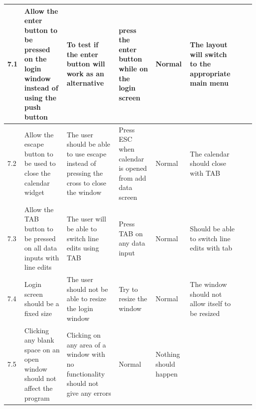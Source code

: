 \begin{landscape}
\begin{center}
\begin{longtable}{|p{1.5cm}|p{2.5cm}|p{2.5cm}|p{4cm}|p{2cm}|p{2cm}|p{1cm}|p{1cm}|}
7.1 & Allow the enter button to be pressed on the login window instead of using the push button & To test if the enter button will work as an alternative & press the enter button while on the login screen & Normal & The layout will switch to the appropriate main menu && \\ \hline
7.2 & Allow the escape button to be used to close the calendar widget & The user should be able to use escape instead of pressing the cross to close the window & Press ESC when calendar is opened from add data screen & Normal & The calendar should close with TAB && \\ \hline
7.3  & Allow the TAB button to be pressed on all data inputs with line edits & The user will be able to switch line edits using TAB & Press TAB on any data input & Normal & Should be able to switch line edits with tab && \\ \hline
7.4 & Login screen should be a fixed size & The user should not be able to resize the login window & Try to resize the window & Normal & The window should not allow itself to be resized && \\ \hline
7.5 & Clicking any blank space on an open window should not affect the program & Clicking on any area of a window with no functionality should not give any errors & Normal & Nothing should happen && \\ \hline



    \end{longtable}
\end{center}
\end{landscape}
